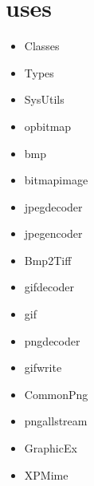 \documentclass{report}
\begin{document}
\section{uses}
\begin{itemize}
\item \begin{ttfamily}Classes\end{ttfamily}\item \begin{ttfamily}Types\end{ttfamily}\item \begin{ttfamily}SysUtils\end{ttfamily}\item \begin{ttfamily}opbitmap\end{ttfamily}\item \begin{ttfamily}bmp\end{ttfamily}\item \begin{ttfamily}bitmapimage\end{ttfamily}\item \begin{ttfamily}jpegdecoder\end{ttfamily}\item \begin{ttfamily}jpegencoder\end{ttfamily}\item \begin{ttfamily}Bmp2Tiff\end{ttfamily}\item \begin{ttfamily}gifdecoder\end{ttfamily}\item \begin{ttfamily}gif\end{ttfamily}\item \begin{ttfamily}pngdecoder\end{ttfamily}\item \begin{ttfamily}gifwrite\end{ttfamily}\item \begin{ttfamily}CommonPng\end{ttfamily}\item \begin{ttfamily}pngallstream\end{ttfamily}\item \begin{ttfamily}GraphicEx\end{ttfamily}\item \begin{ttfamily}XPMime\end{ttfamily}\end{itemize}
\end{document}
